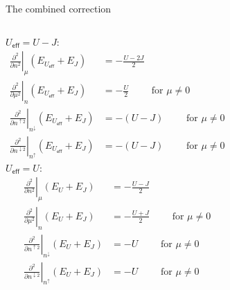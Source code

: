 \documentclass[xcolor=table,aspectratio=169]{beamer}
\numberwithin{equation}{section}
\begin{document}
\begin{frame}{The combined correction}
    \footnotesize
    \begin{columns}
        $U_\mathsf{eff} = U - J$:
        \begin{subequations}
            \begin{align*}
                \left.\frac{\partial^2}{\partial n^2}\right|_{\mu} (E_{U_\mathsf{eff}} + E_J)                     & = -\frac{U-2J}{2}                            \nonumber  \\
                \left.\frac{\partial^2}{\partial \mu^2}\right|_{n} (E_{U_\mathsf{eff}} + E_J)                     & = -\frac{U}{2} \qquad \text{ for } \mu \neq 0 \nonumber \\
                \left.\frac{\partial^2}{\partial n^{\uparrow 2}}\right|_{n^\downarrow} (E_{U_\mathsf{eff}} + E_J) & = -(U - J) \qquad \text{ for } \mu \neq 0     \nonumber \\
                \left.\frac{\partial^2}{\partial n^{\downarrow 2}}\right|_{n^\uparrow} (E_{U_\mathsf{eff}} + E_J) & = -(U - J) \qquad \text{ for } \mu \neq 0\nonumber
            \end{align*}
            \label{eqn:2nd_derivatives_ueff_plus_j}
        \end{subequations}
        $U_\mathsf{eff} = U$:
        \begin{subequations}
            \begin{align*}
                \left.\frac{\partial^2}{\partial n^2}\right|_{\mu} (E_{U} + E_J)                     & = -\frac{U-J}{2}                                \nonumber \\
                \left.\frac{\partial^2}{\partial \mu^2}\right|_{n} (E_{U} + E_J)                     & = -\frac{U+J}{2} \qquad \text{ for } \mu \neq 0 \nonumber \\
                \left.\frac{\partial^2}{\partial n^{\uparrow 2}}\right|_{n^\downarrow} (E_{U} + E_J) & = -U \qquad \text{ for } \mu \neq 0             \nonumber \\
                \left.\frac{\partial^2}{\partial n^{\downarrow 2}}\right|_{n^\uparrow} (E_{U} + E_J) & = -U \qquad \text{ for } \mu \neq 0\nonumber
            \end{align*}%
            \label{eqn:2nd_derivatives_u_plus_j}%
        \end{subequations}%
    \end{columns}
\end{frame}
\end{document}
